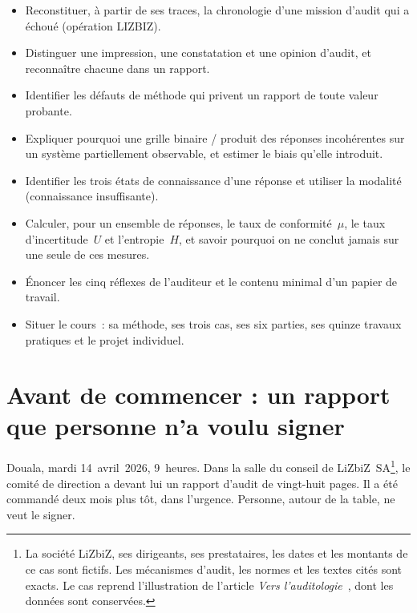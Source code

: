 \begin{boxobjectifs}
\begin{itemize}
    \item Reconstituer, à partir de ses traces, la chronologie d'une mission
          d'audit qui a échoué (opération LIZBIZ).
    \item Distinguer une impression, une constatation et une opinion
          d'audit, et reconnaître chacune dans un rapport.
    \item Identifier les défauts de méthode qui privent un rapport de toute
          valeur probante.
    \item Expliquer pourquoi une grille binaire \OUI{}/\NON{} produit des
          réponses incohérentes sur un système partiellement observable, et
          estimer le biais qu'elle introduit.
    \item Identifier les trois états de connaissance d'une réponse et
          utiliser la modalité \NEK{} (connaissance insuffisante).
    \item Calculer, pour un ensemble de réponses, le taux de conformité~$\mu$,
          le taux d'incertitude~$U$ et l'entropie~$H$, et savoir pourquoi on ne
          conclut jamais sur une seule de ces mesures.
    \item Énoncer les cinq réflexes de l'auditeur et le contenu minimal d'un
          papier de travail.
    \item Situer le cours~: sa méthode, ses trois cas, ses six parties, ses
          quinze travaux pratiques et le projet individuel.
\end{itemize}
\end{boxobjectifs}

\bigskip

\section*{Avant de commencer : un rapport que personne n'a voulu signer}

Douala, mardi 14~avril~2026, 9~heures. Dans la salle du conseil de
LiZbiZ~SA\footnote{La société LiZbiZ, ses dirigeants, ses prestataires, les
dates et les montants de ce cas sont fictifs. Les mécanismes d'audit, les
normes et les textes cités sont exacts. Le cas reprend l'illustration de
l'article \emph{Vers l'auditologie}~\cite{minka2026auditologie}, dont les
données sont conservées.}, le comité de direction a devant lui un rapport
d'audit de vingt-huit pages. Il a été commandé deux mois plus tôt, dans
l'urgence. Personne, autour de la table, ne veut le signer.

